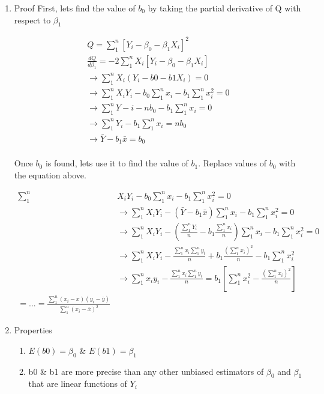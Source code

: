 \documentclass[11pt]{article}
\begin{document}
\begin{enumerate}
\item Proof
\label{sec:org7e19bf8}
First, lets find the value of \(b_0\) by taking the partial derivative of Q with
respect to \(\beta_1\)

\begin{equation}
\begin{split}
Q = \sum_{1}^{n} [Y_i - \beta_{0} - \beta_{1}X_i ]^2\\
\frac{dQ}{d \beta_{1}} = -2 \sum_{1}^{n} X_i [Y_i - \beta_{0} - \beta_{1} X_i]\\
\to \sum_{1}^{n} X_i (Y_i - b0 -b1 X_i) = 0\\
\to \sum_{1}^{n} X_i Y_i - b_0 \sum_{1}^{n} x_i - b_1 \sum_{1}^{n} x_i^2 = 0\\
\to \sum_{1}^{n} Y-i - n b_0 - b_1 \sum_{1}^{n} x_i = 0\\
\to \sum_{1}^{n} Y_i - b_1 \sum_{1}^{n} x_i = nb_0\\
\to \bar{Y} - b_1 \bar{x} = b_0\\
\end{split}
\end{equation}

Once \(b_0\) is found, lets use it to find the value of \(b_1\). Replace
values of \(b_0\) with the equation above.

\begin{equation}
\begin{split}
\sum_{1}^{n} & X_i Y_i - b_0 \sum_{1}^{n} x_i - b_1 \sum_{1}^{n} x_i^2 = 0\\
& \to \sum_{1}^{n} X_i Y_i - (\bar{Y} - b_1 \bar{x}) \sum_{1}^{n} x_i - b_1 \sum_{1}^{n} x_i^2 = 0\\
& \to \sum_{1}^{n} X_i Y_i - (\frac{\sum_{1}^{n} Y_i}{n} - b_1 \frac{\sum_{1}^{n} x_i}{n}) \sum_{1}^{n} x_i - b_1 \sum_{1}^{n} x_i^2 = 0\\
& \to \sum_{1}^{n} X_i Y_i - \frac{\sum_{1}^{n} x_i \sum_{1}^{n} y_i}{n} + b_1 \frac{(\sum_{1}^{n} x_i)^2}{n} - b_1 \sum_{1}^{n} x_i^2\\
& \to \sum_{1}^{n} x_i y_i - \frac{\sum_{1}^{n} x_i \sum_{1}^{n} y_i}{n} = b_1 [ \sum_{1}^{n} x_i^2 - \frac{(\sum_{1}^{n} x_i)^2}{n} ]\\
= ... = \frac{\sum_{1}^{n} (x_i - x)(y_i - \bar{y})}{\sum_{1}^{n} (x_i - \bar{x})^2}
\end{split}
\end{equation}

\item Properties
\label{sec:orge5be1fc}
\begin{enumerate}
\item \(E(b0) = \beta_0\) \& \(E(b1) = \beta_1\)
\item b0 \& b1 are more precise than any other unbiased estimators of \(\beta_0\) and
\(\beta_1\) that are linear functions of \(Y_i\)
\end{enumerate}
\end{enumerate}
\end{document}

